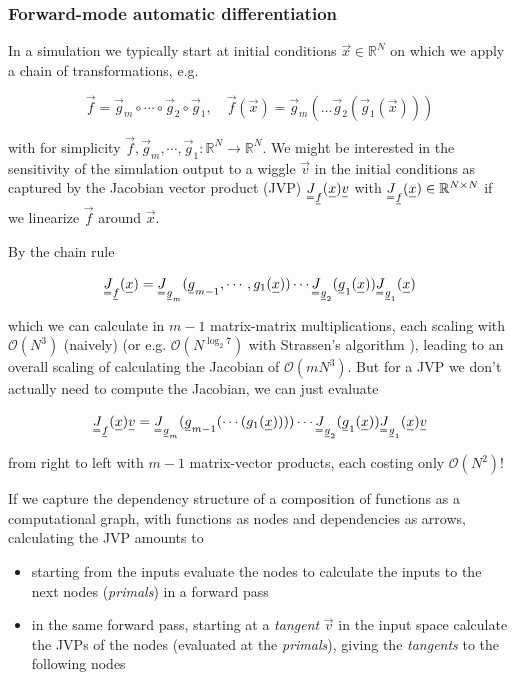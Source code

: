 \subsubsection{Forward-mode automatic differentiation}

In a simulation we typically start at initial conditions $\vec{x} \in \mathbb{R}^N$ on which
we apply a chain of transformations, e.g.

\begin{equation}
    \vec{f} = \vec{g}_m \circ \cdots \circ \vec{g}_2 \circ \vec{g}_1, \quad \vec{f}(\vec{x}) = \vec{g}_m(\dots \vec{g}_2(\vec{g}_1(\vec{x})))
\end{equation}

with for simplicity $\vec{f},\vec{g}_m,\cdots,\vec{g}_1: \mathbb{R}^N \rightarrow \mathbb{R}^N$. We might be interested in
the sensitivity of the simulation output to a wiggle $\vec{v}$ in the initial conditions as captured
by the Jacobian vector product (JVP) $\mat{J}_\vec{f}(\vec{x}) \vec{v}$ with $\mat{J}_\vec{f}(\vec{x}) \in \mathbb{R}^{N \times N}$
if we linearize $\vec{f}$ around $\vec{x}$.

By the chain rule

\begin{equation}
    \mat{J}_\vec{f}(\vec{x}) = \mat{J}_{\vec{g}_m}(\vec{g}_{m-1},\cdots, g_1(\vec{x})) \cdots \mat{J}_{\vec{g}_2}(\vec{g}_1(\vec{x})) \mat{J}_{\vec{g}_1}(\vec{x})
\end{equation}

which we can calculate in $m - 1$ matrix-matrix multiplications, each scaling with $\mathcal{O}(N^3)$ (naively) (or e.g. $\mathcal{O}(N^{\log_2 7})$ with Strassen's algorithm \citep{strassen69}),
leading to an overall scaling of calculating the Jacobian of $\mathcal{O}(mN^3)$. But for a JVP
we don't actually need to compute the Jacobian, we can just evaluate

\begin{equation}
    \mat{J}_\vec{f}(\vec{x}) \vec{v} = \mat{J}_{\vec{g}_m}(\vec{g}_{m-1}(\cdots(g_1(\vec{x})))) \cdots \mat{J}_{\vec{g}_2}(\vec{g}_1(\vec{x})) \mat{J}_{\vec{g}_1}(\vec{x}) \vec{v}
\end{equation}

from right to left with $m-1$ matrix-vector products, each costing only $\mathcal{O}(N^2)$!

If we capture the dependency structure of a composition of functions as a computational graph,
with functions as nodes and dependencies as arrows, calculating the JVP amounts to
\begin{itemize}
    \item starting from the inputs evaluate the nodes to calculate the inputs to the next nodes (\textit{primals}) in a forward pass
    \item in the same forward pass, starting at a \textit{tangent} $\vec{v}$ in the input space calculate the JVPs of the nodes (evaluated at the \textit{primals}), giving the \textit{tangents} to the following nodes
\end{itemize}

